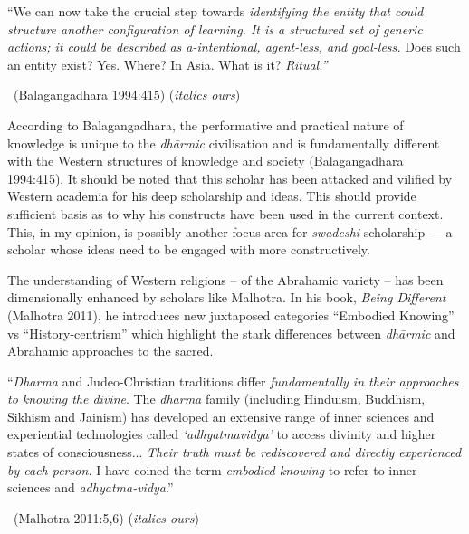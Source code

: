 \begin{myquote}
“We can now take the crucial step towards \textit{identifying the entity that could structure another configuration of learning. It is a structured set of generic actions; it could be described as a-intentional, agent-less, and goal-less.} Does such an entity exist? Yes. Where? In Asia. What is it? \textit{Ritual.”} 

~\hfill (Balagangadhara 1994:415) (\textit{italics ours})
\end{myquote}

According to Balagangadhara, the performative and practical nature of knowledge is unique to the \textit{dhārmic} civilisation and is fundamentally different with the Western structures of knowledge and society (Balagangadhara 1994:415). It should be noted that this scholar has been attacked and vilified by Western academia for his deep scholarship and ideas. This should provide sufficient basis as to why his constructs have been used in the current context. This, in my opinion, is possibly another focus-area for \textit{swadeshi} scholarship — a scholar whose ideas need to be engaged with more constructively.

The understanding of Western religions – of the Abrahamic variety – has been dimensionally enhanced by scholars like Malhotra. In his book, \textit{Being Different} (Malhotra 2011), he introduces new juxtaposed categories “Embodied Knowing” vs “History-centrism” which highlight the stark differences between \textit{dhārmic} and Abrahamic approaches to the sacred.

\begin{myquote}
“\textit{Dharma} and Judeo-Christian traditions differ \textit{fundamentally in their approaches to knowing the divine}. The \textit{dharma} family (including Hinduism, Buddhism, Sikhism and Jainism) has developed an extensive range of inner sciences and experiential technologies called \textit{‘adhyatmavidya’} to access divinity and higher states of consciousness... \textit{Their truth must be rediscovered and directly experienced by each person.} I have coined the term \textit{embodied knowing} to refer to inner sciences and \textit{adhyatma-vidya}.” 

~\hfill (Malhotra 2011:5,6) (\textit{italics ours})
\end{myquote}

